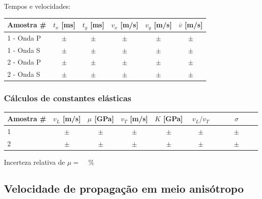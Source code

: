 \documentclass[a4paper,12pt]{article}  %
\begin{document}
Tempos e velocidades:
\begin{center}
	\begin{tabular}{|l|c|c|c|c|c|	}
	\hline
	  Amostra \# &   $t_x$ [ms]  &   $t_y$ [ms]  &   $v_x$ [m/s] & $v_y$ [m/s] &  
	  $\overline{v} $ [m/s]	\\
	\hline \hline
	  1 - Onda P   & $ \quad \pm \quad $  & $ \quad \pm \quad $ & $ \quad \pm \quad $ & $ \quad \pm \quad $ & $ \quad \pm \quad $ \\ \hline
	  1 - Onda S   & $ \quad \pm \quad $  & $ \quad \pm \quad $ & $ \quad \pm \quad $ & $ \quad \pm \quad $ & $ \quad \pm \quad $ \\ \hline
	  2 - Onda P   & $ \quad \pm \quad $  & $ \quad \pm \quad $ & $ \quad \pm \quad $ & $ \quad \pm \quad $ & $ \quad \pm \quad $ \\ \hline
	  2 - Onda S   & $ \quad \pm \quad $  & $ \quad \pm \quad $ & $ \quad \pm \quad $ & $ \quad \pm \quad $ & $ \quad \pm \quad $ \\ \hline
 	\end{tabular}
\end{center}


\subsubsection{\sf Cálculos de constantes elásticas}%

\begin{center}
	\begin{tabular}{|l|c|c|c|c|c|c|}
	\hline
	  Amostra \# &   $v_L$ [m/s]  &   $\mu$ [GPa]  &  $v_T$ [m/s] & $K$ [GPa] & $v_L/v_T$  &  $\sigma$  	\\
	\hline \hline
	  1   & $ \quad \pm \quad $ &  $ \quad \pm \quad $ & $ \quad \pm \quad $ & $ \quad \pm \quad $ & $ \quad \pm \quad $ & $ \qquad \pm \qquad $ \\ \hline
 	  2   & $ \quad \pm \quad $ &  $ \quad \pm \quad $ & $ \quad \pm \quad $ & $ \quad \pm \quad $ & $ \quad \pm \quad $ & $ \qquad \pm \qquad $ \\ \hline
 	\end{tabular}
\end{center}

Incerteza relativa de $\mu=$ ~\underline{\makebox[1cm][r]{~}} \%

\subsection{\sf Velocidade de propagação em meio anisótropo}%
\end{document}

